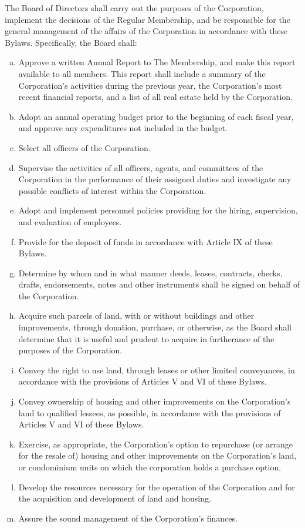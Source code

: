 The Board of Directors shall carry out the purposes of the
Corporation, implement the decisions of the Regular Membership, and be
responsible for the general management of the affairs of the
Corporation in accordance with these Bylaws. Specifically, the Board
shall:
\begin{enumerate}[a.]
\item Approve a written Annual Report to The Membership, and make this
  report available to all members. This report shall include a summary
  of the Corporation's activities during the previous year, the
  Corporation's most recent financial reports, and a list of all real
  estate held by the Corporation.
\item Adopt an annual operating budget prior to the beginning of each
  fiscal year, and approve any expenditures not included in the
  budget.
\item Select all officers of the Corporation.
\item Supervise the activities of all officers, agents, and committees
  of the Corporation in the performance of their assigned duties and
  investigate any possible conflicts of interest within the
  Corporation.
\item Adopt and implement personnel policies providing for the hiring,
  supervision, and evaluation of employees.
\item Provide for the deposit of funds in accordance with Article IX
  of these Bylaws.
\item Determine by whom and in what manner deeds, leases, contracts,
  checks, drafts, endorsements, notes and other instruments shall be
  signed on behalf of the Corporation.
\item Acquire such parcels of land, with or without buildings and
  other improvements, through donation, purchase, or otherwise, as the
  Board shall determine that it is useful and prudent to acquire in
  furtherance of the purposes of the Corporation.
\item Convey the right to use land, through leases or other limited
  conveyances, in accordance with the provisions of Articles V and VI
  of these Bylaws.
\item Convey ownership of housing and other improvements on the
  Corporation's land to qualified lessees, as possible, in accordance with the
  provisions of Articles V and VI of these Bylaws.
\item Exercise, as appropriate, the Corporation's option to repurchase
  (or arrange for the resale of) housing and other improvements on the
  Corporation's land, or condominium units on which the corporation
  holds a purchase option.
\item Develop the resources necessary for the operation of the
  Corporation and for the acquisition and development of land and
  housing.
\item Assure the sound management of the Corporation's finances.
\end{enumerate}

